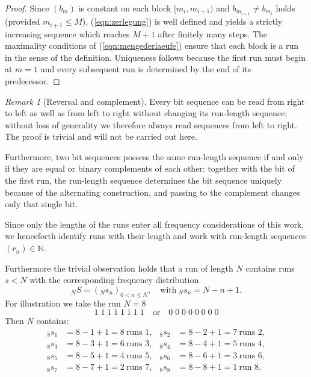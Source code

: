 \documentclass[11pt,a4paper]{scrartcl}
\theoremstyle{plain}
\theoremstyle{definition}
\theoremstyle{remark}
\newtheorem{bem}[satz]{Remark}
\begin{document}
\begin{proof}
Since $(b_m)$ is constant on each block $[m_i,m_{i+1})$ and
$b_{m_{i+1}}\neq b_{m_i}$ holds (provided $m_{i+1}\leq M$),
(\ref{eqn:zerlegung}) is well defined and yields a strictly
increasing sequence which reaches $M+1$ after finitely many steps.
The maximality conditions of (\ref{eqn:mengederlaeufe}) ensure that
each block is a run in the sense of the definition. Uniqueness
follows because the first run must begin at $m=1$ and every
subsequent run is determined by the end of its predecessor.
\end{proof}
\begin{bem}[Reversal and complement]\label{bem:komplement}
Every bit sequence can be read from right to left as well as from
left to right without changing its run-length sequence; without loss
of generality we therefore always read sequences from left to right.
The proof is trivial and will not be carried out here.

Furthermore, two bit sequences possess the same run-length sequence
if and only if they are equal or binary complements of each other:
together with the bit of the first run, the run-length sequence
determines the bit sequence uniquely because of the alternating
construction, and passing to the complement changes only that single
bit.
\end{bem}

\noindent Since only the lengths of the runs enter all frequency
considerations of this work, we henceforth identify runs with their
length and work with run-length sequences $(r_n)\in\mathbb N$.

Furthermore the trivial observation holds that a run of length $N$
contains runs $s<N$ with the corresponding frequency distribution
\begin{equation}\label{eqn:haufigkeitenteillaeufe}
  _NS=(_Ns_n)_{0<n\leq N},\quad\text{with}\ _Ns_n=N-n+1.
\end{equation}
For illustration we take the run $N=8$
\begin{equation}\label{eqn:teillaufindemlauf}
  1\;1\;1\;1\;1\;1\;1\;1\quad\text{or}\quad 0\;0\;0\;0\;0\;0\;0\;0
\end{equation}
Then $N$ contains:
\begin{align*}
  {}_8s_1&=8-1+1=8\ \text{runs } 1, & {}_8s_2&=8-2+1=7\ \text{runs } 2,\\
  {}_8s_3&=8-3+1=6\ \text{runs } 3, & {}_8s_4&=8-4+1=5\ \text{runs } 4,\\
  {}_8s_5&=8-5+1=4\ \text{runs } 5, & {}_8s_6&=8-6+1=3\ \text{runs } 6,\\
  {}_8s_7&=8-7+1=2\ \text{runs } 7, & {}_8s_8&=8-8+1=1\ \text{run } 8.
\end{align*}
\end{document}
